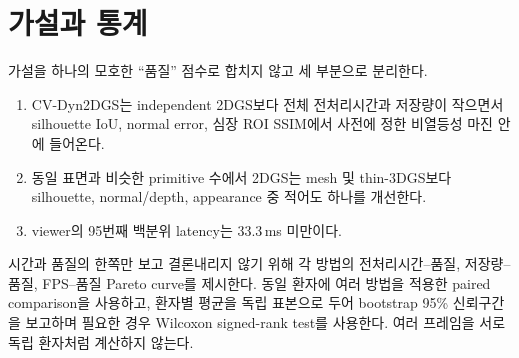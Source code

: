 \section{가설과 통계}
\label{sec:statistics}

가설을 하나의 모호한 ``품질'' 점수로 합치지 않고 세 부분으로 분리한다.

\begin{enumerate}[leftmargin=2em]
  \item CV-Dyn2DGS는 independent 2DGS보다 전체 전처리시간과 저장량이 작으면서
  silhouette IoU, normal error, 심장 ROI SSIM에서 사전에 정한 비열등성 마진 안에
  들어온다.
  \item 동일 표면과 비슷한 primitive 수에서 2DGS는 mesh 및 thin-3DGS보다 silhouette,
  normal/depth, appearance 중 적어도 하나를 개선한다.
  \item viewer의 95번째 백분위 latency는 33.3\,ms 미만이다.
\end{enumerate}

시간과 품질의 한쪽만 보고 결론내리지 않기 위해 각 방법의 전처리시간--품질,
저장량--품질, FPS--품질 Pareto curve를 제시한다. 동일 환자에 여러 방법을 적용한
paired comparison을 사용하고, 환자별 평균을 독립 표본으로 두어 bootstrap 95\% 신뢰구간을
보고하며 필요한 경우 Wilcoxon signed-rank test를 사용한다. 여러 프레임을 서로 독립
환자처럼 계산하지 않는다.


